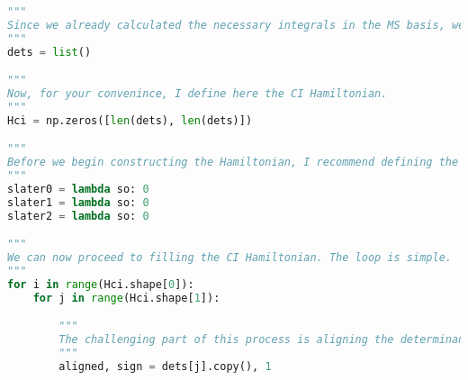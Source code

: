 \raggedbottom\begin{lstlisting}[language=Python, caption={\acrshort{ci} exercise code.}, label=code:ci_exercise]
"""
Since we already calculated the necessary integrals in the MS basis, we can proceed. The next step involves generating determinants. We will store these in a simple list, with each determinant represented by an array of numbers, where each number corresponds to an occupied spinorbital. Since we are programming for Full Configuration Interaction (FCI), we aim to generate all possible determinants. However, should we decide to implement methods like CIS, CID, or CISD, we could easily limit the number of excitations. It is important to remember that for all CI methods, the rest of the code remains unchanged. The only difference lies in the determinants used. Don't overcomplicate this. Generating all possible determinants can be efficiently achieved using a simple list comprehension. I recommend employing the combinations function from the itertools package to facilitate this task.
"""
dets = list()

"""
Now, for your convenince, I define here the CI Hamiltonian.
"""
Hci = np.zeros([len(dets), len(dets)])

"""
Before we begin constructing the Hamiltonian, I recommend defining the Slater-Condon rules. Let's consider that the input for these functions will be an array of spinorbitals, segmented into unique and common ones. A practical approach might be to arrange this 1D array with all unique spinorbitals at the front, followed by the common spinorbitals. This arrangement allows you to easily determine the number of unique spinorbitals based on the rule being applied, meaning you will always know how many entries at the beginning of the array are unique spinorbitals. While you can develop your own method for managing this array, I will proceed under the assumption that the Slater-Condon rules we use will take a single array of spinorbitals and return an unsigned matrix element. The sign of this element will be corrected later in the script. For simplicity and flexibility, I'll define these rules using lambda functions, but you're welcome to expand them into full functions if you prefer.
"""
slater0 = lambda so: 0
slater1 = lambda so: 0
slater2 = lambda so: 0

"""
We can now proceed to filling the CI Hamiltonian. The loop is simple.
"""
for i in range(Hci.shape[0]):
    for j in range(Hci.shape[1]):

        """
        The challenging part of this process is aligning the determinants. In this step, I transfer the contents of the j-th determinant into the "aligned" determinant. It's important not to alter the j-th determinant directly within its original place, as doing so could disrupt the computation of other matrix elements. Instead, we carry out the next steps on the determinant now contained in the "aligned" variable. Additionally, the element sign is defined at this stage. You probably want to leave this unchanged.
        """
        aligned, sign = dets[j].copy(), 1


\end{lstlisting}
